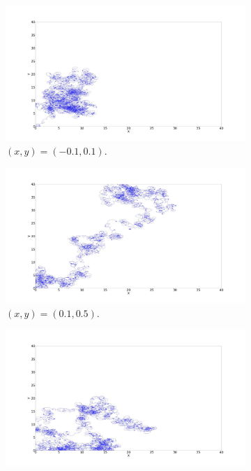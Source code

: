 \begin{figure}[ht]
	\centering
	\begin{subfigure}[b]{0.55\textwidth}
		\centering
		\includegraphics[width=\textwidth]{LateX images/log/xy/g1-1.4}
		\caption{$(x,y) = (-0.1,0.1)$.}
		\label{f:g94}
	\end{subfigure}
	\hfill
	\begin{subfigure}[b]{0.55\textwidth}
		\centering
		\includegraphics[width=\textwidth]{LateX images/log/xy/g2-1.4}
		\caption{$(x,y) = (0.1,0.5)$.}
		\label{f:g95}
	\end{subfigure}
	\hfill
	\begin{subfigure}[b]{0.55\textwidth}
		\centering
		\includegraphics[width=\textwidth]{LateX images/log/xy/g3-1.4}

\end{subfigure}
\end{figure}
